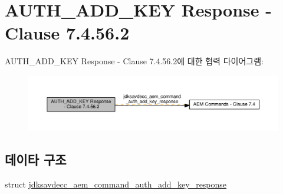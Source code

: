 \hypertarget{group__command__auth__add__key__response}{}\section{A\+U\+T\+H\+\_\+\+A\+D\+D\+\_\+\+K\+EY Response -\/ Clause 7.4.56.2}
\label{group__command__auth__add__key__response}
A\+U\+T\+H\+\_\+\+A\+D\+D\+\_\+\+K\+EY Response -\/ Clause 7.4.56.2에 대한 협력 다이어그램\+:
\nopagebreak
\begin{figure}[H]
\begin{center}
\leavevmode
\includegraphics[width=350pt]{group__command__auth__add__key__response}
\end{center}
\end{figure}
\subsection*{데이타 구조}
\begin{DoxyCompactItemize}
\item 
struct \hyperlink{structjdksavdecc__aem__command__auth__add__key__response}{jdksavdecc\+\_\+aem\+\_\+command\+\_\+auth\+\_\+add\+\_\+key\+\_\+response}
\end{DoxyCompactItemize}
